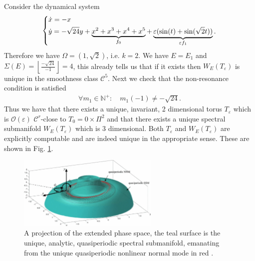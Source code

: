 \begin{ex}[]
	Consider the dynamical system
	\begin{align}
		\begin{dcases}
			\dot{x} = -x \\
			\dot{y} = -\sqrt{24}y + \underbrace{x^2 + x^3 + x^4 + x^5}_{f_0} + \underbrace{\varepsilon(\sin(t) + \sin(\sqrt{2}t))}_{\varepsilon f_1}.
		\end{dcases}
	\end{align}
	Therefore we have $\Omega = (1,\sqrt{2})$, i.e. $k=2$. We have $E = E_1$ and $\Sigma(E) = \left\lfloor \frac{- \sqrt{24}}{-1}\right\rfloor = 4$, this already tells us that if it exists then $W_{E}(T_{\varepsilon})$ is unique in the smoothness class $\mathcal{C}^{5}$. Next we check that the non-resonance condition is satisfied
	\begin{align}
		\forall m_1\in\mathbb{N}^{+}: \quad m_1(-1) \neq - \sqrt{24}.
	\end{align}
	Thus we have that there exists a unique, invariant, 2 dimensional torus $T_{\varepsilon}$ which is $\mathcal{O}(\varepsilon)$ $\mathcal{C}^{r}$-close to $T_0=0\times\Pi^{2}$ and that there exists a unique spectral submanifold $W_{E}(T_{\varepsilon})$ which is 3 dimensional. Both $T_{\varepsilon}$ and $W_{E}(T_\varepsilon)$ are explicitly computable and are indeed unique in the appropriate sense. These are shown in Fig. \ref{fig:ssm_ex2}.
	\begin{figure}[h!]
		\centering
		\includegraphics[width=0.6\textwidth]{figures/ch9/ponsioen2016.pdf}
		\caption{A projection of the extended phase space, the teal surface is the unique, analytic, quasiperiodic spectral submanifold, emanating from the unique quasiperiodic nonlinear normal mode in red \cite{Ponsioen2016}.}
		\label{fig:ssm_ex2}
	\end{figure}	
\end{ex}

